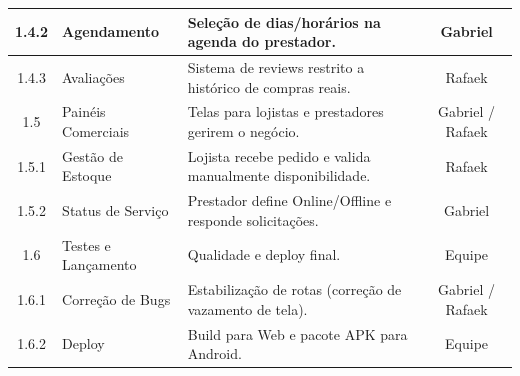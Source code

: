 \documentclass[11pt, a4paper]{article}
\begin{document}
\begin{center}
\begin{tabularx}{\textwidth}{|c|X|X|c|}
\hline
1.4.2 & Agendamento & Seleção de dias/horários na agenda do prestador. & Gabriel \\
\hline
1.4.3 & Avaliações & Sistema de reviews restrito a histórico de compras reais. & Rafaek \\
\hline
\rowcolor{rowgray}
1.5 & Painéis Comerciais & Telas para lojistas e prestadores gerirem o negócio. & Gabriel / Rafaek \\
\hline
1.5.1 & Gestão de Estoque & Lojista recebe pedido e valida manualmente disponibilidade. & Rafaek \\
\hline
1.5.2 & Status de Serviço & Prestador define Online/Offline e responde solicitações. & Gabriel \\
\hline
\rowcolor{rowgray}
1.6 & Testes e Lançamento & Qualidade e deploy final. & Equipe \\
\hline
1.6.1 & Correção de Bugs & Estabilização de rotas (correção de vazamento de tela). & Gabriel / Rafaek \\
\hline
1.6.2 & Deploy & Build para Web e pacote APK para Android. & Equipe \\
\hline
\end{tabularx}
\end{center}
\end{document}

